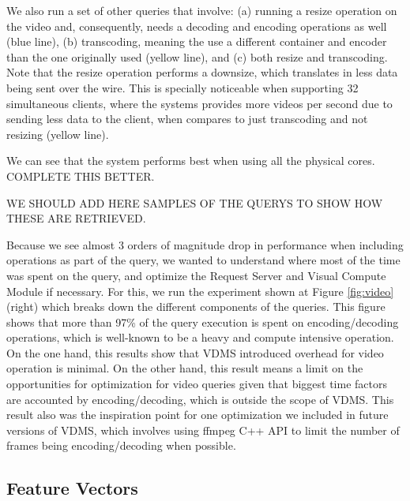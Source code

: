 We also run a set of other queries that involve: (a) running a resize operation
on the video and, consequently, needs a decoding and
encoding operations as well (blue line),
(b) transcoding, meaning the use a different container and encoder
than the one originally used (yellow line), and (c) both resize and transcoding.
Note that the resize operation performs a downsize, which translates in less
data being sent over the wire. This is specially noticeable when supporting 32
simultaneous clients, where the systems provides more videos per second due to
sending less data to the client, when compares to just transcoding and not resizing (yellow line).

We can see that the system performs best when using all the physical cores.
COMPLETE THIS BETTER.

WE SHOULD ADD HERE SAMPLES OF THE QUERYS TO SHOW HOW THESE ARE RETRIEVED.

Because we see almost 3 orders of magnitude drop in performance when including
operations as part of the query, we wanted to understand where most of the time
was spent on the query, and optimize the Request Server and Visual Compute Module
if necessary. For this, we run the experiment shown at
Figure \ref{fig:video} (right) which breaks down the different components of the
queries. This figure shows that more than 97\% of the query execution is spent
on encoding/decoding operations, which is well-known to be a
heavy and compute intensive operation.
On the one hand, this results show that VDMS introduced overhead for
video operation is minimal. On the other hand, this result means a
limit on the opportunities for optimization for video queries given
that biggest time factors are accounted by encoding/decoding, which is
outside the scope of VDMS.
This result also was the inspiration point for one optimization we included
in future versions of VDMS, which involves using ffmpeg C++ API to
limit the number of frames being encoding/decoding when possible.


\subsection{Feature Vectors}
\label{features}

